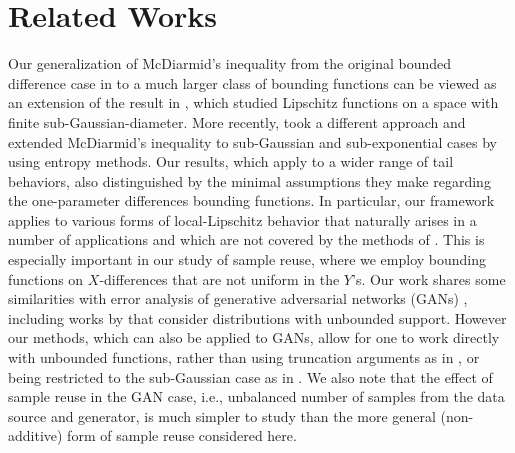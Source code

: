 \section{Related Works}
Our generalization  of McDiarmid's inequality from the original bounded difference case in \cite{mcdiarmid1989method} to a much larger class of bounding functions can be viewed as an extension  of the result in \cite{kontorovich2014concentration}, which studied Lipschitz functions on a space with finite sub-Gaussian-diameter.  More recently,  \cite{maurer2021concentration}  took a different approach and extended  McDiarmid's inequality to sub-Gaussian and sub-exponential cases by using  entropy methods.  Our results, which apply to a wider range of tail behaviors,  also distinguished by the minimal assumptions they make regarding the one-parameter differences bounding functions.  In particular, our framework applies to various forms of local-Lipschitz behavior that naturally arises in a number of applications and which are not covered by   the methods of \cite{kontorovich2014concentration,maurer2021concentration}.   This is especially important in our study of sample reuse, where we employ bounding functions on $X$-differences that are not uniform in the $Y$'s.  Our work shares some similarities with  error analysis of generative adversarial networks (GANs) \cite{liang2021well}, including works by  \cite{huang2022error,biau2021some} that consider distributions with unbounded support. However our methods, which can also be applied to GANs,  allow for one to work directly with   unbounded functions, rather than using truncation arguments as in \cite{huang2022error},  or being restricted to the  sub-Gaussian  case as in \cite{biau2021some}.  We also note that the effect of sample reuse in the GAN case, i.e., unbalanced number of samples from the data source and generator, is much simpler to study than the more general (non-additive) form of sample reuse considered here.

